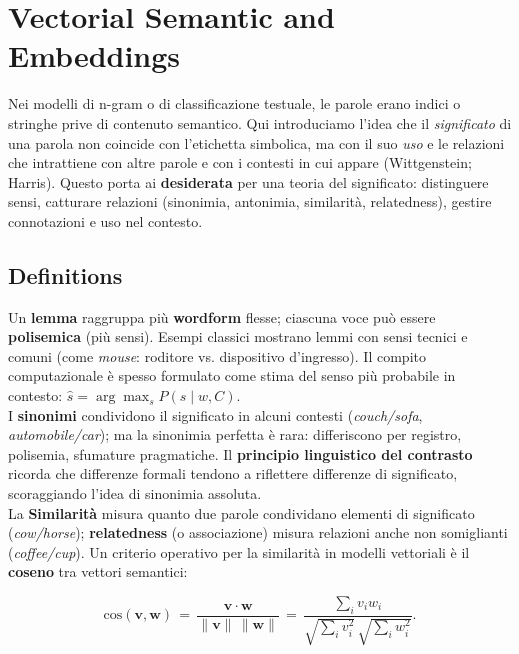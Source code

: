 
\newpage

\section{Vectorial Semantic and Embeddings}

    Nei modelli di n-gram o di classificazione testuale, le parole erano indici o stringhe prive di contenuto semantico. Qui introduciamo l'idea che il \emph{significato} di una parola non coincide con l'etichetta simbolica, ma con il suo \emph{uso} e le relazioni che intrattiene con altre parole e con i contesti in cui appare (Wittgenstein; Harris). Questo porta ai \textbf{desiderata} per una teoria del significato: distinguere sensi, catturare relazioni (sinonimia, antonimia, similarità, relatedness), gestire connotazioni e uso nel contesto.

    \subsection{Definitions}
    
        Un \textbf{lemma} raggruppa più \textbf{wordform} flesse; ciascuna voce può essere \textbf{polisemica} (più sensi). Esempi classici mostrano lemmi con sensi tecnici e comuni (come \emph{mouse}: roditore vs. dispositivo d'ingresso). Il compito computazionale è spesso formulato come stima del senso più probabile in contesto: $\hat s = \arg\max_s P(s\mid w, C)$.\\
    
        I \textbf{sinonimi} condividono il significato in alcuni contesti (\emph{couch/sofa}, \emph{automobile/car}); ma la sinonimia perfetta è rara: differiscono per registro, polisemia, sfumature pragmatiche. Il \textbf{principio linguistico del contrasto} ricorda che differenze formali tendono a riflettere differenze di significato, scoraggiando l'idea di sinonimia assoluta.\\
        
        La \textbf{Similarità} misura quanto due parole condividano elementi di significato (\emph{cow/horse}); \textbf{relatedness} (o associazione) misura relazioni anche non somiglianti (\emph{coffee/cup}). Un criterio operativo per la similarità in modelli vettoriali è il \textbf{coseno} tra vettori semantici:
        
        $$
            \mathrm{cos}(\mathbf{v},\mathbf{w}) \,=\, \frac{\mathbf{v}\cdot\mathbf{w}}{\lVert \mathbf{v}\rVert\,\lVert \mathbf{w}\rVert} \,=\, \frac{\sum_i v_i w_i}{\sqrt{\sum_i v_i^2}\,\sqrt{\sum_i w_i^2}}.
        $$
        
